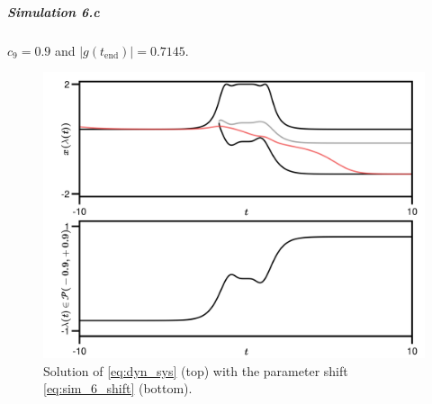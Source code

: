 \documentclass[../main.tex]{subfiles}
\begin{document}
\subparagraph{Simulation 6.c}\label{subpar:sim_6_c}

$c_{9}=0.9$ and $|g(t_{\text{end}})| = 0.7145$.

\begin{figure}[H]
    \centering 
    \includegraphics[keepaspectratio, width=\textwidth]{../figures/sim_6.c.png}
    \caption{Solution of \eqref{eq:dyn_sys} (top) with the parameter shift \eqref{eq:sim_6_shift} (bottom).}
    \label{fig:sim_6_c}
\end{figure}
\end{document}
